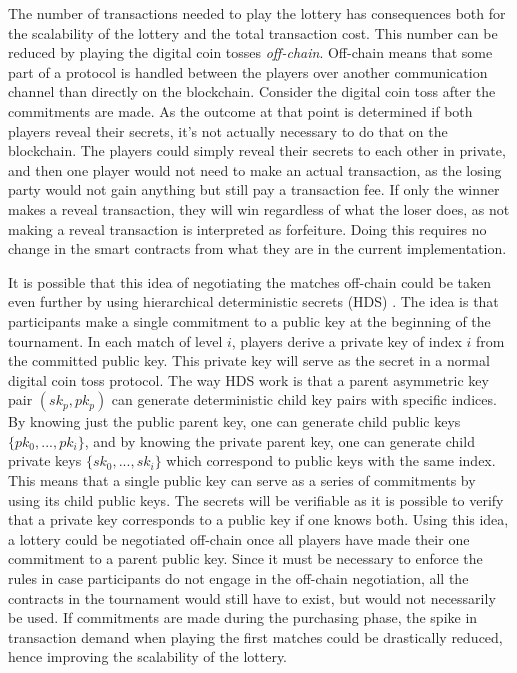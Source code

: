 The number of transactions needed to play the lottery has consequences both for the scalability of the lottery and the total transaction cost. This number can be reduced by playing the digital coin tosses \emph{off-chain}. Off-chain means that some part of a protocol is handled between the players over another communication channel than directly on the blockchain. Consider the digital coin toss after the commitments are made. As the outcome at that point is determined if both players reveal their secrets, it's not actually necessary to do that on the blockchain. The players could simply reveal their secrets to each other in private, and then one player would not need to make an actual transaction, as the losing party would not gain anything but still pay a transaction fee. If only the winner makes a reveal transaction, they will win regardless of what the loser does, as not making a reveal transaction is interpreted as forfeiture. Doing this requires no change in the smart contracts from what they are in the current implementation.

It is possible that this idea of negotiating the matches off-chain could be taken even further by using hierarchical deterministic secrets (HDS) \cite{wuille_bitcoin_2012}. The idea is that participants make a single commitment to a public key at the beginning of the tournament. In each match of level $i$, players derive a private key of index $i$ from the committed public key. This private key will serve as the secret in a normal digital coin toss protocol. The way HDS work is that a parent asymmetric key pair $(sk_p, pk_p)$ can generate deterministic child key pairs with specific indices. By knowing just the public parent key, one can generate child public keys $\{pk_0, ..., pk_i\}$, and by knowing the private parent key, one can generate child private keys $\{sk_0, ..., sk_i\}$ which correspond to public keys with the same index. This means that a single public key can serve as a series of commitments by using its child public keys. The secrets will be verifiable as it is possible to verify that a private key corresponds to a public key if one knows both. Using this idea, a lottery could be negotiated off-chain once all players have made their one commitment to a parent public key. Since it must be necessary to enforce the rules in case participants do not engage in the off-chain negotiation, all the contracts in the tournament would still have to exist, but would not necessarily be used. If commitments are made during the purchasing phase, the spike in transaction demand when playing the first matches could be drastically reduced, hence improving the scalability of the lottery.

